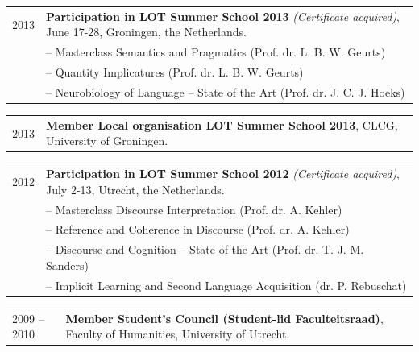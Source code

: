 \documentclass[a4paper,10pt]{article}
\def\leftcolwidth{.12\textwidth}
\def\tablevspace{10pt}
\begin{document}
\vspace{\tablevspace}

\noindent
\begin{tabularx}{\textwidth}{ p{\leftcolwidth} X }
  2013 & \textbf{Participation in LOT Summer School 2013} 
         \textit{(Certificate acquired)}, June 17-28, 
         Groningen, the Netherlands.\\
       & -- {Masterclass Semantics and Pragmatics} (Prof. dr. L. B. W. Geurts)\\
       & -- {Quantity Implicatures} (Prof. dr. L. B. W. Geurts)\\
       & -- {Neurobiology of Language -- State of the Art} (Prof. dr. J. C. J. Hoeks)\\
\end{tabularx}

\vspace{\tablevspace}

\noindent
\begin{tabularx}{\textwidth}{ p{\leftcolwidth} X }
  2013
  & \textbf{Member Local organisation LOT Summer School 2013},
    CLCG, University of Groningen.\\
\end{tabularx}

\vspace{\tablevspace}

\noindent
\begin{tabularx}{\textwidth}{ p{\leftcolwidth} X }
  2012 & \textbf{Participation in LOT Summer School 2012} 
         \textit{(Certificate acquired)}, July 2-13,
         Utrecht, the Netherlands.\\
       & -- {Masterclass Discourse Interpretation} (Prof. dr. A. Kehler)\\
       & -- {Reference and Coherence in Discourse} (Prof. dr. A. Kehler)\\
       & -- {Discourse and Cognition -- State of the Art} (Prof. dr. T. J. M. Sanders)\\
       & -- {Implicit Learning and Second Language Acquisition}
         (dr. P. Rebuschat)\\
\end{tabularx}

\vspace{\tablevspace}

\noindent
\begin{tabularx}{\textwidth}{ p{\leftcolwidth} X }
  2009 -- 2010
  & \textbf{Member Student's Council (Student-lid Faculteitsraad)},
    Faculty of Humanities, University of Utrecht.\\
\end{tabularx}
\end{document}
